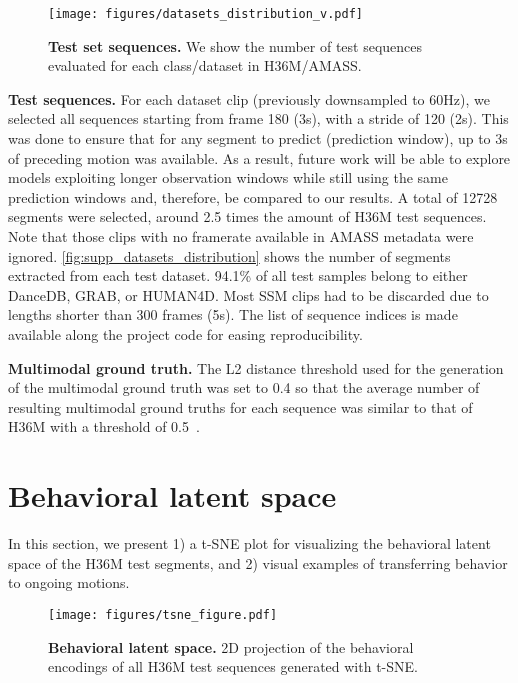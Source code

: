 \documentclass[10pt,twocolumn,letterpaper]{article}
\begin{document}
\begin{figure}[t!]
    \centering
    \texttt{[image: figures/datasets\_distribution\_v.pdf]}
    \caption{\textbf{Test set sequences. }We show the number of test sequences evaluated for each class/dataset in H36M/AMASS.}
    \vspace{-0.3cm}
    \label{fig:supp_datasets_distribution}
\end{figure}

\textbf{Test sequences. }For each dataset clip (previously downsampled to 60Hz), we selected all sequences starting from frame 180 (3s), with a stride of 120 (2s). This was done to ensure that for any segment to predict (prediction window), up to 3s of preceding motion was available. As a result, future work will be able to explore models exploiting longer observation windows while still using the same prediction windows and, therefore, be compared to our results. A total of 12728 segments were selected, around 2.5 times the amount of H36M test sequences. Note that those clips with no framerate available in AMASS metadata were ignored. \autoref{fig:supp_datasets_distribution} shows the number of segments extracted from each test dataset. 94.1\% of all test samples belong to either DanceDB, GRAB, or HUMAN4D. Most SSM clips had to be discarded due to lengths shorter than 300 frames (5s). The list of sequence indices is made available along the project code for easing reproducibility.

\textbf{Multimodal ground truth. }The L2 distance threshold used for the generation of the multimodal ground truth was set to 0.4 so that the average number of resulting multimodal ground truths for each sequence was similar to that of H36M with a threshold of 0.5~\cite{yuan2020dlow}. 






 

\section{Behavioral latent space}
\label{sec:supp_behavior_transference}

In this section, we present 1) a t-SNE plot for visualizing the behavioral latent space of the H36M test segments, and 2) visual examples of transferring behavior to ongoing motions.

\begin{figure}
    \centering
    \texttt{[image: figures/tsne\_figure.pdf]}
    \caption{\textbf{Behavioral latent space. }2D projection of the behavioral encodings of all H36M test sequences generated with t-SNE.}
    \label{fig:supp_tsne_behaviors}
\end{figure}
\end{document}
